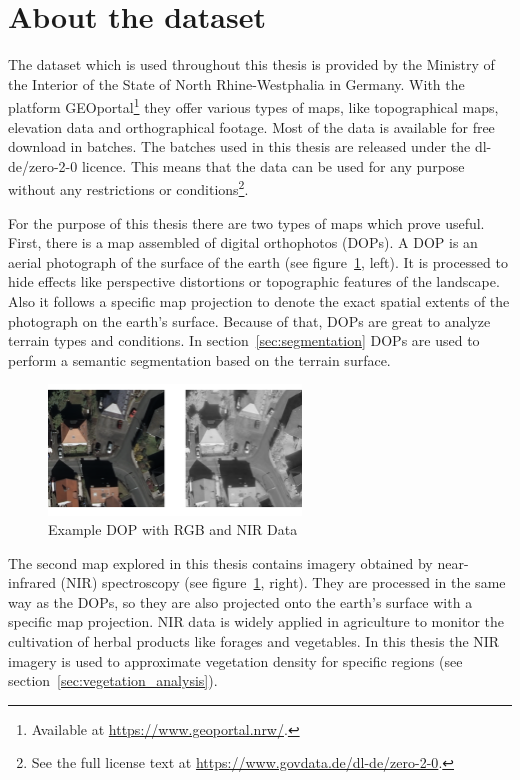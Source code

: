 \section{About the dataset}
\label{sec:dataset_analysis}
The dataset which is used throughout this thesis is provided by the Ministry of the Interior of the State of North Rhine-Westphalia in Germany. With the platform GEOportal\footnote{Available at \url{https://www.geoportal.nrw/}.} they offer various types of maps, like topographical maps, elevation data and orthographical footage. Most of the data is available for free download in batches. The batches used in this thesis are released under the dl-de/zero-2-0 licence. This means that the data can be used for any purpose without any restrictions or conditions\footnote{See the full license text at \url{https://www.govdata.de/dl-de/zero-2-0}.}.

For the purpose of this thesis there are two types of maps which prove useful. First, there is a map assembled of digital orthophotos (DOPs). A DOP is an aerial photograph of the surface of the earth (see figure~\ref{fig:dop_rgb_nir_example}, left). It is processed to hide effects like perspective distortions or topographic features of the landscape. Also it follows a specific map projection to denote the exact spatial extents of the photograph on the earth's surface. Because of that, DOPs are great to analyze terrain types and conditions. In section~\ref{sec:segmentation} DOPs are used to perform a semantic segmentation based on the terrain surface.

\begin{figure}[h]
    \centering
    \includegraphics[width=0.6\textwidth]{images/dop_rgb_nir_example}
    \caption{Example DOP with RGB and NIR Data}
    \label{fig:dop_rgb_nir_example}
\end{figure}

The second map explored in this thesis contains imagery obtained by near-infrared (NIR) spectroscopy (see figure~\ref{fig:dop_rgb_nir_example}, right). They are processed in the same way as the DOPs, so they are also projected onto the earth's surface with a specific map projection. NIR data is widely applied in agriculture to monitor the cultivation of herbal products like forages and vegetables. In this thesis the NIR imagery is used to approximate vegetation density for specific regions (see section~\ref{sec:vegetation_analysis}).

